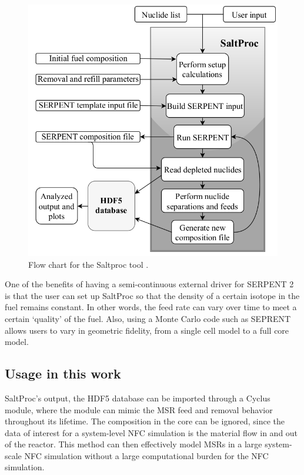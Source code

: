 \begin{figure}[htbp!]
	\begin{center}
		\includegraphics[scale=0.3]{./images/saltproc.png}
	\end{center}
	\caption{Flow chart for the Saltproc tool
		\cite{rykhlevskii_online_2017}.}
	\label{fig:saltproc}
\end{figure}


One of the benefits of having a semi-continuous external driver for
SERPENT 2 is that the user can set up SaltProc so that the density
of a certain isotope in the fuel remains constant. In other words,
the feed rate can vary over time to meet a certain `quality' of the fuel.
Also, using a Monte Carlo code such as SEPRENT allows users to vary
in geometric fidelity, from a single cell model to a full core model.

\subsection{Usage in this work}
SaltProc's output, the HDF5 database can be imported through a Cyclus
module, where the module can mimic the \gls{MSR} feed and removal
behavior throughout its lifetime. The composition in the core can
be ignored, since the data of interest for a system-level \gls{NFC} simulation
is the material flow in and out of the reactor. This method can
then effectively model \glspl{MSR} in a large system-scale \gls{NFC}
simulation without a large computational burden for the \gls{NFC} simulation.
